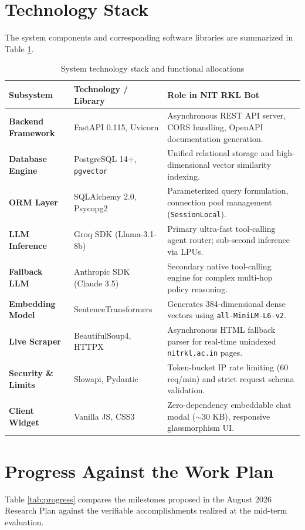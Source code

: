 \documentclass[12pt,a4paper]{report}
\begin{document}
\section{Technology Stack}
The system components and corresponding software libraries are summarized in Table \ref{tab:tech_stack}.

\begin{table}[htbp]
\centering
\small
\caption{System technology stack and functional allocations}
\label{tab:tech_stack}
\begin{tabularx}{\textwidth}{llX}
\toprule
\textbf{Subsystem} & \textbf{Technology / Library} & \textbf{Role in NIT RKL Bot} \\
\midrule
\textbf{Backend Framework} & FastAPI 0.115, Uvicorn & Asynchronous REST API server, CORS handling, OpenAPI documentation generation. \\
\addlinespace
\textbf{Database Engine} & PostgreSQL 14+, \texttt{pgvector} & Unified relational storage and high-dimensional vector similarity indexing. \\
\addlinespace
\textbf{ORM Layer} & SQLAlchemy 2.0, Psycopg2 & Parameterized query formulation, connection pool management (\texttt{SessionLocal}). \\
\addlinespace
\textbf{LLM Inference} & Groq SDK (Llama-3.1-8b) & Primary ultra-fast tool-calling agent router; sub-second inference via LPUs. \\
\addlinespace
\textbf{Fallback LLM} & Anthropic SDK (Claude 3.5) & Secondary native tool-calling engine for complex multi-hop policy reasoning. \\
\addlinespace
\textbf{Embedding Model} & SentenceTransformers & Generates 384-dimensional dense vectors using \texttt{all-MiniLM-L6-v2}. \\
\addlinespace
\textbf{Live Scraper} & BeautifulSoup4, HTTPX & Asynchronous HTML fallback parser for real-time unindexed \texttt{nitrkl.ac.in} pages. \\
\addlinespace
\textbf{Security \& Limits} & Slowapi, Pydantic & Token-bucket IP rate limiting (60 req/min) and strict request schema validation. \\
\addlinespace
\textbf{Client Widget} & Vanilla JS, CSS3 & Zero-dependency embeddable chat modal ($\sim$30 KB), responsive glassmorphism UI. \\
\bottomrule
\end{tabularx}
\end{table}

\section{Progress Against the Work Plan}
Table \ref{tab:progress} compares the milestones proposed in the August 2026 Research Plan against the verifiable accomplishments realized at the mid-term evaluation.
\end{document}
